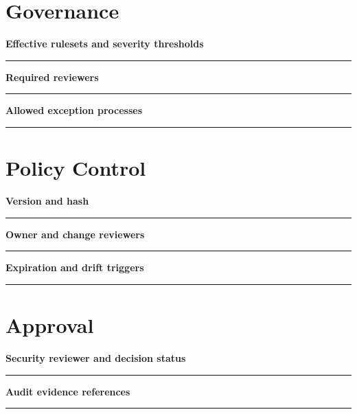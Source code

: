 \documentclass[11pt,letterpaper]{article}
\begin{document}
\section{Governance}
\noindent\textbf{Effective rulesets and severity thresholds}\par
\vspace{1.1em}\noindent\rule{0.96\linewidth}{0.4pt}\par\vspace{0.65em}
\noindent\textbf{Required reviewers}\par
\vspace{1.1em}\noindent\rule{0.96\linewidth}{0.4pt}\par\vspace{0.65em}
\noindent\textbf{Allowed exception processes}\par
\vspace{1.1em}\noindent\rule{0.96\linewidth}{0.4pt}\par\vspace{0.65em}
\section{Policy Control}
\noindent\textbf{Version and hash}\par
\vspace{1.1em}\noindent\rule{0.96\linewidth}{0.4pt}\par\vspace{0.65em}
\noindent\textbf{Owner and change reviewers}\par
\vspace{1.1em}\noindent\rule{0.96\linewidth}{0.4pt}\par\vspace{0.65em}
\noindent\textbf{Expiration and drift triggers}\par
\vspace{1.1em}\noindent\rule{0.96\linewidth}{0.4pt}\par\vspace{0.65em}
\section{Approval}
\noindent\textbf{Security reviewer and decision status}\par
\vspace{1.1em}\noindent\rule{0.96\linewidth}{0.4pt}\par\vspace{0.65em}
\noindent\textbf{Audit evidence references}\par
\vspace{1.1em}\noindent\rule{0.96\linewidth}{0.4pt}\par\vspace{0.65em}
\end{document}
